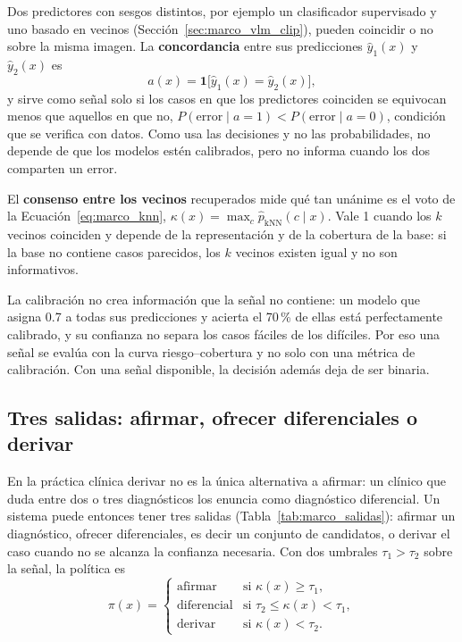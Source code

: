 \label{sec:marco_concordancia}%
Dos predictores con sesgos distintos, por ejemplo un clasificador supervisado y uno basado en vecinos
(Sección~\ref{sec:marco_vlm_clip}), pueden coincidir o no sobre la misma imagen. La \textbf{concordancia} entre
sus predicciones $\hat{y}_1(x)$ y $\hat{y}_2(x)$ es
\begin{equation}
    a(x) = \mathbf{1}\bigl[\hat{y}_1(x) = \hat{y}_2(x)\bigr],
    \label{eq:marco_concordancia}
\end{equation}
y sirve como señal solo si los casos en que los predictores coinciden se equivocan menos que aquellos en que
no, $P(\text{error} \mid a = 1) < P(\text{error} \mid a = 0)$, condición que se verifica con datos. Como usa
las decisiones y no las probabilidades, no depende de que los modelos estén calibrados, pero no informa
cuando los dos comparten un error.

El \textbf{consenso entre los vecinos} recuperados mide qué tan unánime es el voto de la
Ecuación~\ref{eq:marco_knn}, $\kappa(x) = \max_c \hat{p}_{\text{kNN}}(c \mid x)$. Vale 1 cuando los $k$
vecinos coinciden y depende de la representación y de la cobertura de la base: si la base no contiene casos
parecidos, los $k$ vecinos existen igual y no son informativos.

La calibración no crea información que la señal no contiene: un modelo que asigna 0.7 a todas sus
predicciones y acierta el 70\,\% de ellas está perfectamente calibrado, y su confianza no separa los casos
fáciles de los difíciles. Por eso una señal se evalúa con la curva riesgo--cobertura y no solo con una métrica
de calibración. Con una señal disponible, la decisión además deja de ser binaria.

\subsection{Tres salidas: afirmar, ofrecer diferenciales o derivar}
\label{sec:marco_tres_salidas}

\begingroup En la práctica clínica derivar no es la única alternativa a afirmar: un clínico que duda entre dos
o tres diagnósticos los enuncia como diagnóstico diferencial. Un sistema puede entonces tener tres salidas
(Tabla~\ref{tab:marco_salidas}): afirmar un diagnóstico, ofrecer diferenciales, es decir un conjunto de
candidatos, o derivar el caso cuando no se alcanza la confianza necesaria. Con dos umbrales
$\tau_1 > \tau_2$ sobre la señal, la política es
\begin{equation}
    \pi(x) =
    \begin{cases}
        \text{afirmar} & \text{si } \kappa(x) \ge \tau_1,\\
        \text{diferencial} & \text{si } \tau_2 \le \kappa(x) < \tau_1,\\
        \text{derivar} & \text{si } \kappa(x) < \tau_2.
    \end{cases}
    \label{eq:marco_politica}
\end{equation}\endgroup

